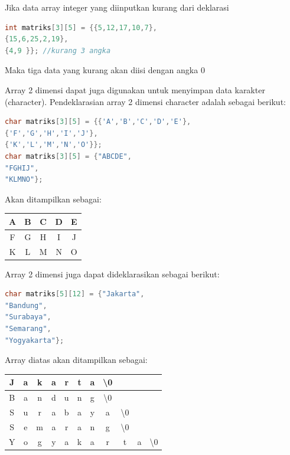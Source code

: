 Jika data array integer yang diinputkan kurang dari deklarasi

\begin{lstlisting}[language=c++, numbers=none]
int matriks[3][5] = {{5,12,17,10,7},
{15,6,25,2,19},
{4,9 }}; //kurang 3 angka
\end{lstlisting}

Maka tiga data yang kurang akan diisi dengan angka 0

Array 2 dimensi dapat juga digunakan untuk menyimpan data karakter
(character). Pendeklarasian array 2 dimensi character adalah sebagai
berikut:

\begin{lstlisting}[language=c++, numbers=none]
char matriks[3][5] = {{'A','B','C','D','E'},
{'F','G','H','I','J'},
{'K','L','M','N','O'}};
char matriks[3][5] = {"ABCDE",
"FGHIJ",
"KLMNO"};
\end{lstlisting}

Akan ditampilkan sebagai:

\begin{tabular}{|c|c|c|c|c|}
	\hline
	A &B &C& D& E \\ \hline
	F &G &H &I& J \\ \hline
	K &L &M& N& O \\ \hline
	
\end{tabular}

Array 2 dimensi juga dapat dideklarasikan sebagai berikut:

\begin{lstlisting}[language=c++, numbers=none]
char matriks[5][12] = {"Jakarta",
"Bandung",
"Surabaya",
"Semarang",
"Yogyakarta"};
\end{lstlisting}

Array diatas akan ditampilkan sebagai:

\begin{tabular}{|c|c|c|c|c|c|c|c|c|c|c|}
	\hline
	J & a & k & a & r & t & a & \textbackslash{0} & & & \\ \hline
	B & a & n & d & u & n & g & \textbackslash{0} & & & \\ \hline
	S & u & r & a & b & a & y & a &\textbackslash{0}  & &\\ \hline
	S & e & m & a & r & a & n & g & \textbackslash{0} & & \\ \hline
	Y & o & g & y & a & k & a & r & t & a &   \textbackslash{0} \\ \hline
	
\end{tabular}


